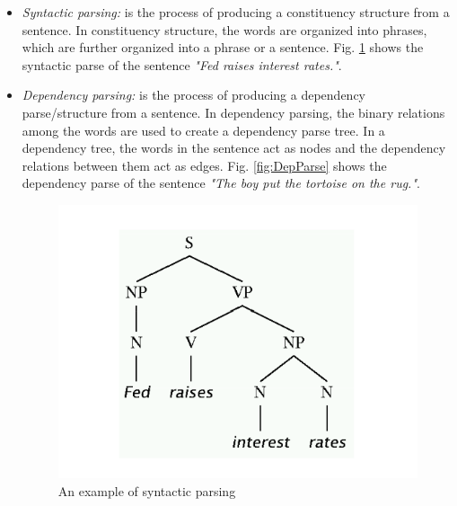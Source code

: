 \begin{itemize}

\item \textit{Syntactic parsing:} is the process of producing a constituency structure from a sentence. In constituency structure, the words are organized into phrases, which are further organized into a phrase or a sentence. %
Fig. \ref{fig:SynParse} shows the syntactic parse of the sentence \textit{"Fed raises interest rates."}.

\item \textit{Dependency parsing:} is the process of producing a dependency parse/structure from a sentence. In dependency parsing, the binary relations among the words are used to create a dependency parse tree. In a dependency tree, the words in the sentence act as nodes and the dependency relations between them act as edges. Fig. \ref{fig:DepParse} shows the dependency parse of the sentence \textit{"The boy put the tortoise on the rug."}.

\begin{figure}
\centering
\includegraphics[scale=0.5]{figures/SyntacticParse.png}
\caption{An example of syntactic parsing}\label{fig:SynParse}
\end{figure}


\end{itemize}
